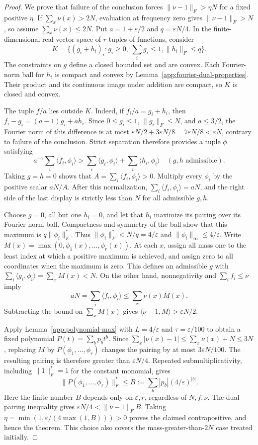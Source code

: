 \begin{proof}
We prove that failure of the conclusion forces
$\|\nu-1\|_F>\eta N$ for a fixed positive $\eta$.
If $\sum_x\nu(x)>2N$, evaluation at frequency zero gives
$\|\nu-1\|_F>N$, so assume $\sum_x\nu(x)\leq2N$.
Put $a=1+\varepsilon/2$ and $q=\varepsilon N/4$.
In the finite-dimensional real vector space of $r$ tuples of functions,
consider
\[
 K=\{(g_i+h_i)_i:g_i\geq0,\ \sum_ig_i\leq1,
                              \|h_i\|_F\leq q\}.
\]
The constraints on $g$ define a closed bounded set and are convex.
Each Fourier-norm ball for $h_i$ is compact and convex by
Lemma~\ref{app:fourier-dual-properties}.  Their product and its continuous
image under addition are compact, so $K$ is closed and convex.

The tuple $f/a$ lies outside $K$.  Indeed, if $f_i/a=g_i+h_i$, then
$f_i-g_i=(a-1)g_i+ah_i$.  Since $0\leq g_i\leq1$,
$\|g_i\|_F\leq N$, and $a\leq3/2$, the Fourier norm of this difference
is at most $\varepsilon N/2+3\varepsilon N/8
=7\varepsilon N/8<\varepsilon N$, contrary to failure of the conclusion.
Strict separation therefore provides a tuple $\phi$ satisfying
\[
 a^{-1}\sum_i\langle f_i,\phi_i\rangle
 >\sum_i\langle g_i,\phi_i\rangle+\sum_i\langle h_i,\phi_i\rangle
 \quad(g,h\text{ admissible}).
\]
Taking $g=h=0$ shows that $A=\sum_i\langle f_i,\phi_i\rangle>0$.
Multiply every $\phi_i$ by the positive scalar $aN/A$.  After this
normalization, $\sum_i\langle f_i,\phi_i\rangle=aN$, and the right side
of the last display is strictly less than $N$ for all admissible $g,h$.

Choose $g=0$, all but one $h_i=0$, and let that $h_i$ maximize its pairing
over its Fourier-norm ball.  Compactness and symmetry of the ball show that
this maximum is $q\|\phi_i\|_F^*$.  Thus
$\|\phi_i\|_F^*<N/q=4/\varepsilon$ and
$\|\phi_i\|_\infty\leq4/\varepsilon$.
Write $M(x)=\max(0,\phi_1(x),\ldots,\phi_r(x))$.
At each $x$, assign all mass one to the least index at which a positive
maximum is achieved, and assign zero to all coordinates when the maximum
is zero.  This defines an admissible $g$ with
$\sum_i\langle g_i,\phi_i\rangle=\sum_xM(x)<N$.
On the other hand, nonnegativity and $\sum_if_i\leq\nu$ imply
\[
 aN=\sum_i\langle f_i,\phi_i\rangle
 \leq\sum_x\nu(x)M(x).
\]
Subtracting the bound on $\sum_xM(x)$ gives
$\langle\nu-1,M\rangle>\varepsilon N/2$.

Apply Lemma~\ref{app:polynomial-max} with
$L=4/\varepsilon$ and $\tau=\varepsilon/100$ to obtain a fixed polynomial
$P(t)=\sum_b p_b t^b$.  Since
$\sum_x|\nu(x)-1|\leq\sum_x\nu(x)+N\leq3N$, replacing $M$ by
$P(\phi_1,\ldots,\phi_r)$ changes the pairing by at most
$3\varepsilon N/100$.  The resulting pairing is therefore greater than
$\varepsilon N/4$.
Repeated submultiplicativity, including $\|1\|_F^*=1$ for the constant
monomial, gives
\[
 \|P(\phi_1,\ldots,\phi_r)\|_F^*
 \leq B:=\sum_b|p_b|(4/\varepsilon)^{|b|}.
\]
Here the finite number $B$ depends only on $\varepsilon,r$, regardless of
$N,f,\nu$.  The dual pairing inequality gives
$\varepsilon N/4<\|\nu-1\|_F B$.
Taking $\eta=\min(1,\varepsilon/(4\max(1,B)))>0$ proves the claimed
contrapositive, and hence the theorem.  This choice also covers the
mass-greater-than-$2N$ case treated initially.
\end{proof}

